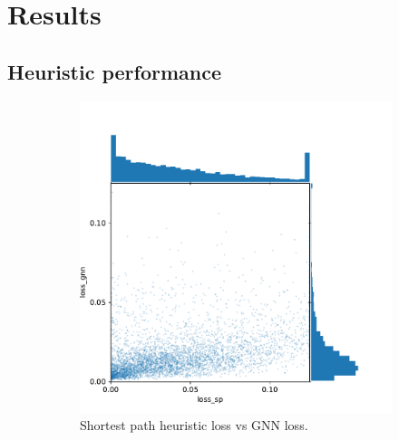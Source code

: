\documentclass[english, 12pt, a4paper, sci, utf8, a-2b, online]{aaltothesis}
\begin{document}
\section{Results}
\label{sec:results}
\subsection{Heuristic performance}
\label{sec:heur-perf}

\begin{figure} 
    \begin{subfigure}{0.5\textwidth}
        \centering
        \includegraphics[width=\linewidth]{figures/loss-loss.pdf}
        \caption{Shortest path heuristic loss vs GNN loss.}
        \label{fig:results-ll}
    \end{subfigure}
    \begin{subfigure}{0.5\textwidth}
        \centering

\end{subfigure}
\end{figure}
\end{document}
